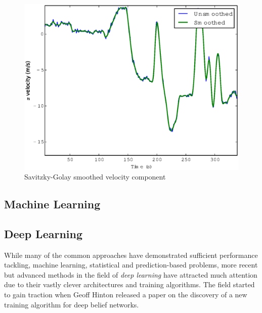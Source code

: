 \documentclass[a4paper, 11pt, twocolumn]{report}
\begin{document}
\begin{figure}[h]
    \center
    \includegraphics[width=\linewidth]{savgolsmooth}
    \caption{Savitzky-Golay smoothed velocity component}
    \label{fig:savgolsmooth}
\end{figure}


\subsection{Machine Learning}



















\subsection{Deep Learning}

While many of the common approaches have demonstrated sufficient performance tackling, machine learning, statistical and prediction-based problems, more recent but advanced methods in the field of \textit{deep learning} have attracted much attention due to their vastly clever architectures and training algorithms. The field started to gain traction when Geoff Hinton \cite{hinton2006fast} released a paper on the discovery of a new training algorithm for deep belief networks.
\end{document}
